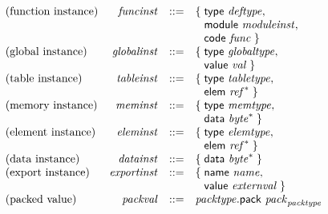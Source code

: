 $$
\begin{array}{@{}lrrl@{}l@{}}
\mbox{(function instance)} & {\mathit{funcinst}} &::=& \{\; \begin{array}[t]{@{}l@{}l@{}}
\mathsf{type}~{\mathit{deftype}},\; \\
  \mathsf{module}~{\mathit{moduleinst}},\; \\
  \mathsf{code}~{\mathit{func}} \;\}\end{array} \\
\mbox{(global instance)} & {\mathit{globalinst}} &::=& \{\; \begin{array}[t]{@{}l@{}l@{}}
\mathsf{type}~{\mathit{globaltype}},\; \\
  \mathsf{value}~{\mathit{val}} \;\}\end{array} \\
\mbox{(table instance)} & {\mathit{tableinst}} &::=& \{\; \begin{array}[t]{@{}l@{}l@{}}
\mathsf{type}~{\mathit{tabletype}},\; \\
  \mathsf{elem}~{{\mathit{ref}}^\ast} \;\}\end{array} \\
\mbox{(memory instance)} & {\mathit{meminst}} &::=& \{\; \begin{array}[t]{@{}l@{}l@{}}
\mathsf{type}~{\mathit{memtype}},\; \\
  \mathsf{data}~{{\mathit{byte}}^\ast} \;\}\end{array} \\
\mbox{(element instance)} & {\mathit{eleminst}} &::=& \{\; \begin{array}[t]{@{}l@{}l@{}}
\mathsf{type}~{\mathit{elemtype}},\; \\
  \mathsf{elem}~{{\mathit{ref}}^\ast} \;\}\end{array} \\
\mbox{(data instance)} & {\mathit{datainst}} &::=& \{\; \begin{array}[t]{@{}l@{}l@{}}
\mathsf{data}~{{\mathit{byte}}^\ast} \;\}\end{array} \\
\mbox{(export instance)} & {\mathit{exportinst}} &::=& \{\; \begin{array}[t]{@{}l@{}l@{}}
\mathsf{name}~{\mathit{name}},\; \\
  \mathsf{value}~{\mathit{externval}} \;\}\end{array} \\
\mbox{(packed value)} & {\mathit{packval}} &::=& {\mathit{packtype}}.\mathsf{pack}~{{\mathit{pack}}}_{{\mathit{packtype}}} \\

\end{array}$$
